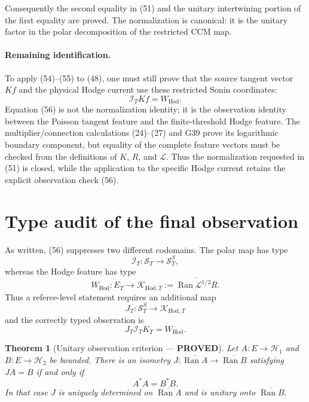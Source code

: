 \documentclass[11pt]{article}
\newtheorem{theorem}{Theorem}
\newcommand{\PROVED}{\textcolor{green!45!black}{\textbf{PROVED}}}
\newcommand{\Ran}{\operatorname{Ran}}
\newcommand{\Hod}{\mathrm{Hod}}
\newcommand{\cL}{\mathscr L}
\begin{document}
Consequently the second equality in (51) and the unitary intertwining portion
of the first equality are proved.  The normalization is canonical: it is the
unitary factor in the polar decomposition of the restricted CCM map.

\paragraph{Remaining identification.}
To apply (54)--(55) to (48), one must still prove that the source tangent vector
$Kf$ and the physical Hodge current use these restricted Sonin coordinates:
\begin{equation}
 \boxed{\mathcal I_TKf=W_{\Hod}.}                        \tag{56}
\end{equation}
Equation (56) is not the normalization identity; it is the observation
identity between the Poisson tangent feature and the finite-threshold Hodge
feature.  The multiplier/connection calculations (24)--(27) and G39 prove its
logarithmic boundary component, but equality of the complete feature vectors
must be checked from the definitions of $K$, $R$, and $\cL$.  Thus the
normalization requested in (51) is closed, while the application to the
specific Hodge current retains the explicit observation check (56).

\section{Type audit of the final observation}

As written, (56) suppresses two different codomains.  The polar map has type
\[
 \mathcal I_T:\mathcal S_T\longrightarrow\mathcal S_T^S,
\]
whereas the Hodge feature has type
\[
 W_{\Hod}:E_T\longrightarrow
 \mathcal K_{\Hod,T}:=\overline{\Ran\cL^{1/2}R}.
\]
Thus a referee-level statement requires an additional map
\begin{equation}
 J_T:\mathcal S_T^S\longrightarrow\mathcal K_{\Hod,T}  \tag{57}
\end{equation}
and the correctly typed observation is
\begin{equation}
 J_T\mathcal I_TK_T=W_{\Hod}.                            \tag{58}
\end{equation}

\begin{theorem}[Unitary observation criterion --- \PROVED]
Let $A:E\to\mathcal H_1$ and $B:E\to\mathcal H_2$ be bounded.  There is an
isometry $J:\overline{\Ran A}\to\overline{\Ran B}$ satisfying $JA=B$ if and
only if
\begin{equation}
 A^*A=B^*B.                                              \tag{59}
\end{equation}
In that case $J$ is uniquely determined on $\overline{\Ran A}$ and is unitary
onto $\overline{\Ran B}$.
\end{theorem}
\end{document}
